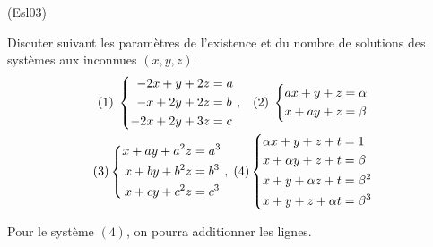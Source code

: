\begin{tiny}(Esl03)\end{tiny} Discuter suivant les paramètres de l'existence et du nombre de solutions des systèmes aux inconnues $(x,y,z)$.
\begin{multline*}
(1) \;\left\lbrace 
\begin{aligned}
 -2x + y + 2z &= a \\
 -x + 2y + 2z &= b\\
 -2x +2y +3z &= c
\end{aligned}
\right. ,\hspace{0.3cm}
(2)\;\left\lbrace 
\begin{aligned}
  ax+y+z &= \alpha \\
  x+ay+z &= \beta
\end{aligned}
\right. \\
(3)\left\lbrace 
\begin{aligned}
 x + ay + a^2z &= a^3 \\
 x + by + b^2z &= b^3\\
 x + cy + c^2z &= c^3
\end{aligned}
\right.  ,\;
(4)\left\lbrace 
\begin{aligned}
 \alpha x + y + z + t &= 1 \\
 x + \alpha y + z + t &= \beta\\
 x + y + \alpha z + t &= \beta^2 \\
 x + y + z + \alpha t &= \beta^3
\end{aligned}
\right.
\end{multline*}

Pour le système $(4)$, on pourra additionner les lignes.
